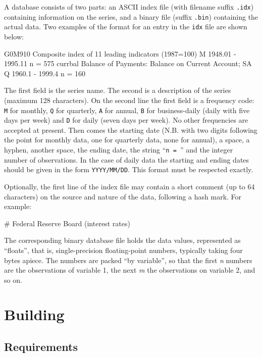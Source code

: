 A  database consists of two parts: an ASCII index file
(with filename suffix \verb+.idx+) containing information on the
series, and a binary file (suffix \verb+.bin+) containing the actual
data.  Two examples of the format for an entry in the \verb+idx+ file
are shown below:

\begin{code}
G0M910  Composite index of 11 leading indicators (1987=100) 
M 1948.01 - 1995.11  n = 575
currbal Balance of Payments: Balance on Current Account; SA 
Q 1960.1 - 1999.4 n = 160
\end{code}

The first field is the series name.  The second is a description of
the series (maximum 128 characters).  On the second line the first
field is a frequency code: \verb+M+ for monthly, \verb+Q+ for
quarterly, \verb+A+ for annual, \verb+B+ for business-daily (daily
with five days per week) and \verb+D+ for daily (seven days per week).
No other frequencies are accepted at present.  Then comes the starting
date (N.B. with two digits following the point for monthly data, one
for quarterly data, none for annual), a space, a hyphen, another
space, the ending date, the string ``\verb+n = +'' and the integer
number of observations. In the case of daily data the starting and
ending dates should be given in the form \verb+YYYY/MM/DD+. This
format must be respected exactly.

Optionally, the first line of the index file may contain a short
comment (up to 64 characters) on the source and nature of the data,
following a hash mark.  For example:

\begin{code}
# Federal Reserve Board (interest rates)
\end{code}

The corresponding binary database file holds the data values,
represented as ``floats'', that is, single-precision floating-point
numbers, typically taking four bytes apiece.  The numbers are packed
``by variable'', so that the first \emph{n} numbers are the
observations of variable 1, the next \emph{m} the observations on
variable 2, and so on.

\chapter{Building }
\label{app-build}

\section{Requirements}
\label{sec:build-req}

